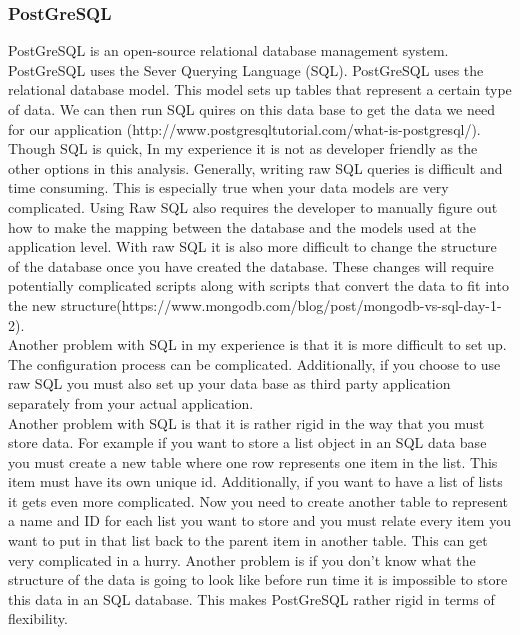 \documentclass[letterpaper,10pt]{article}
\begin{document}
		\subsubsection{PostGreSQL}
				PostGreSQL is an open-source relational database management system. PostGreSQL uses the Sever Querying Language (SQL). PostGreSQL uses the relational database model. This model sets up tables that represent a certain type of data. We can then run SQL quires on this data base to get the data we need for our application (http://www.postgresqltutorial.com/what-is-postgresql/).\\
				Though SQL is quick, In my experience it is not as developer friendly as the other options in this analysis. Generally, writing raw SQL queries is difficult and time consuming. This is especially true when your data models are very complicated. Using Raw SQL also requires the developer to manually figure out how to make the mapping between the database and the models used at the application level. With raw SQL it is also more difficult to change the structure of the database once you have created the database. These changes will require potentially complicated scripts along with scripts that convert the data to fit into the new structure(https://www.mongodb.com/blog/post/mongodb-vs-sql-day-1-2).\\
				Another problem with SQL in my experience is that it is more difficult to set up. The configuration process can be complicated. Additionally, if you choose to use raw SQL you must also set up your data base as third party application separately from your actual application.\\
				Another problem with SQL is that it is rather rigid in the way that you must store data. For example if you want to store a list object in an SQL data base you must create a new table where one row represents one item in the list. This item must have its own unique id. Additionally, if you want to have a list of lists it gets even more complicated. Now you need to create another table to represent a name and ID for each list you want to store and you must relate every item you want to put in that list back to the parent item in another table. This can get very complicated in a hurry. Another problem is if you don't know what the structure of the data is going to look like before run time it is impossible to store this data in an SQL database. This makes PostGreSQL rather rigid in terms of flexibility.
\end{document}
